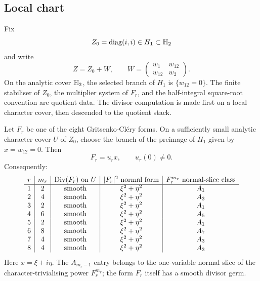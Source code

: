 \subsection*{Local chart}

Fix
\[
  Z_0=\operatorname{diag}(i,i)\in H_1\subset\mathbb{H}_2
\]
and write
\[
  Z=Z_0+W,\qquad
  W=
  \begin{pmatrix}w_1&w_{12}\\ w_{12}&w_2\end{pmatrix}.
\]
On the analytic cover \(\mathbb{H}_2\), the selected branch of \(H_1\) is
\(\{w_{12}=0\}\).  The finite stabiliser of \(Z_0\), the multiplier
system of \(F_r\), and the half-integral square-root convention are
quotient data.  The divisor computation is made first on a local
character cover, then descended to the quotient stack.

\begin{theorem}
\label{wn:thm:arnold-type-boundary-GC}
Let \(F_r\) be one of the eight Gritsenko-Cl\'ery forms.  On a
sufficiently small analytic character cover \(U\) of \(Z_0\), choose the
branch of the preimage of \(H_1\) given by \(x=w_{12}=0\).  Then
\[
  F_r=u_r x,\qquad u_r(0)\neq0 .
\]
Consequently:
\[
\begin{array}{c|c|c|c|c}
r&m_r&\mathrm{Div}(F_r)\text{ on }U&|F_r|^2\text{ normal form}
&F_r^{m_r}\text{ normal-slice class}\\ \hline
1&2&\text{smooth}&\xi^2+\eta^2&A_1\\
2&4&\text{smooth}&\xi^2+\eta^2&A_3\\
3&2&\text{smooth}&\xi^2+\eta^2&A_1\\
4&6&\text{smooth}&\xi^2+\eta^2&A_5\\
5&2&\text{smooth}&\xi^2+\eta^2&A_1\\
6&8&\text{smooth}&\xi^2+\eta^2&A_7\\
7&4&\text{smooth}&\xi^2+\eta^2&A_3\\
8&4&\text{smooth}&\xi^2+\eta^2&A_3
\end{array}
\]
Here \(x=\xi+i\eta\).  The \(A_{m_r-1}\) entry belongs to the
one-variable normal slice of the character-trivialising power
\(F_r^{m_r}\); the form \(F_r\) itself has a smooth divisor germ.
\end{theorem}


